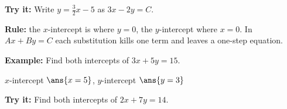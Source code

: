 \documentclass[12pt]{article}
\begin{document}
\begin{tryitbox}
\textbf{Try it:} \quad Write $y = \frac{3}{2}x - 5$ as $3x - 2y = C$.\\[2pt]
\end{tryitbox}


\begin{formulabox}
\textbf{Rule:} the $x$-intercept is where $y = 0$, the $y$-intercept where
$x = 0$. In $Ax + By = C$ each substitution kills one term and leaves a
one-step equation.
\end{formulabox}

\begin{examplebox}
\textbf{Example:} \quad Find both intercepts of $3x + 5y = 15$.

$x$-intercept $\ans{x = 5}$, \quad $y$-intercept $\ans{y = 3}$
\end{examplebox}

\begin{tryitbox}
\textbf{Try it:} \quad Find both intercepts of $2x + 7y = 14$.\\[2pt]
\end{tryitbox}
\end{document}
